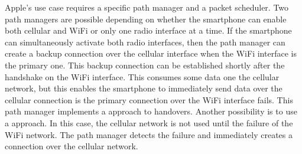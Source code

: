 \documentclass[letterpaper,10pt,english]{sphinxmanual}
\begin{document}
\sphinxAtStartPar
Apple’s use case requires a specific path manager and a packet scheduler. Two path managers are possible depending on whether the smartphone can enable both cellular and Wi\sphinxhyphen{}Fi or only one radio interface at a time. If the smartphone can simultaneously activate both radio interfaces, then the path manager can create a backup connection over the cellular interface when the Wi\sphinxhyphen{}Fi interface is the primary one. This backup connection can be established shortly after the handshake on the Wi\sphinxhyphen{}Fi interface. This consumes some data one the cellular network, but this enables the smartphone to immediately send data over the cellular connection is the primary connection over the Wi\sphinxhyphen{}Fi interface fails.
This path manager implements a  approach to handovers. Another possibility is to use a  approach. In this case, the cellular network is not used until the failure of the Wi\sphinxhyphen{}Fi network. The path manager detects the failure and immediately creates a connection over the cellular network.
\end{document}
